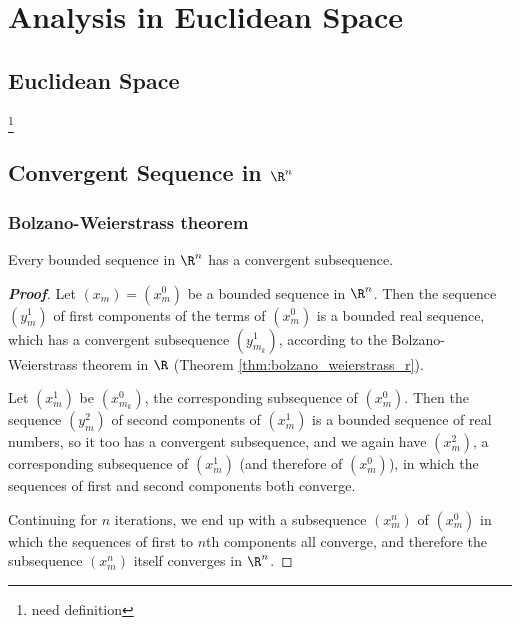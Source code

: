 
\chapter{Analysis in Euclidean Space}

\section{Euclidean Space}

\begin{definition}\label{def:euclidean_space}
\footnote{need definition}
\end{definition}



\section{Convergent Sequence in $\R^n$}

\subsection{Bolzano-Weierstrass theorem}

\begin{theorem}\label{thm:bolzano_weierstrass_multiple_real}
Every bounded sequence in $\R^n$ has a convergent subsequence.
\end{theorem}

\begin{proof}[\bf Proof]%
Let $(x_m) = (x_m^0)$ be a bounded sequence in $\R^n$. Then the sequence $(y_m^1)$ of first components of the terms of $(x_m^0)$ is a bounded real sequence, which has a convergent subsequence $(y_{m_k}^1)$, according to the Bolzano-Weierstrass theorem in $\R$ (Theorem \ref{thm:bolzano_weierstrass_r}).

Let $(x_{m}^1)$ be $(x_{m_k}^0)$, the corresponding subsequence of $(x_m^0)$. Then the sequence $(y_m^2)$ of second components of $(x_m^1)$ is a bounded sequence of real numbers, so it too has a convergent subsequence, and we again have $(x_{m}^2)$, a corresponding subsequence of $(x_{m}^1)$ (and therefore of $(x_{m}^0)$), in which the sequences of first and second components both converge.

Continuing for $n$ iterations, we end up with a subsequence $(x_{m}^n)$ of $(x_{m}^0)$ in which the sequences of first to $n$th components all converge, and therefore the subsequence $(x_{m}^n)$ itself converges in $\R^n$.
\end{proof}



